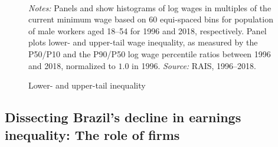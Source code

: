 \begin{figure}[!htb]
  \centering
  \caption{\label{fig:histograms_log_1996_2018}Lower- and upper-tail inequality}
  \prefigvspace
  \\
  \postfigvspace
  \begin{minipage}[t]{1\columnwidth}%
    \begin{spacing}{0.75}
      \emph{\scriptsize{}Notes: }{\scriptsize{}Panels  and  show histograms of log wages in multiples of the current minimum wage based on 60 equi-spaced bins for population of male workers aged 18--54 for 1996 and 2018, respectively. Panel  plots lower- and upper-tail wage inequality, as measured by the P50/P10 and the P90/P50 log wage percentile ratios between 1996 and 2018, normalized to $1.0$ in 1996. %
      \emph{\scriptsize{}Source: } RAIS, 1996--2018.}
    \end{spacing}
  \end{minipage}
\end{figure}




\subsection{Dissecting Brazil's decline in earnings inequality: The role of firms\label{subsec:Motivating-facts}}

